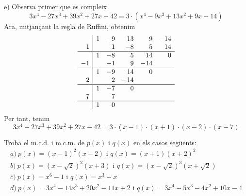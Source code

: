 \begin{solucio}
e) Observa primer que es compleix\[
3x^{4}-27x^{3}+39x^{2}+27x-42=3\cdot \left(
x^{4}-9x^{3}+13x^{2}+9x-14\right)
\]Ara, mitjançant la regla de Ruffini, obtenim\[
\begin{array}{r|rrrrr}
& 1 & -9 & 13 & 9 & -14 \\
1 & & 1 & -8 & 5 & 14 \\\hline
& 1 & -8 & 5 & 14 & 0 \\
-1 & & -1 & 9 & -14 & \\\hline
& 1 & -9 & 14 & 0 & \\
2 & & 2 & -14 & & \\\hline
& 1 & -7 & 0 & & \\
7 & & 7 & & & \\\hline
 & 1 & 0 & & &
\end{array}\]Per tant, tenim\[
3x^{4}-27x^{3}+39x^{2}+27x-42=3\cdot (x-1)\cdot (x+1)\cdot (x-2)\cdot (x-7)
\]
\end{solucio}

\begin{exercici}
Troba el m.c.d. i m.c.m. de $p(x)$ i $q(x)$ en els casos següents:\[
\begin{array}{l}
a)~p(x)=(x-1)^{2}(x-2)\text{ i }q(x)=(x+1)(x+2)^{2} \\
b)~p(x)=(x-\sqrt{2})^{2}(x+3)\text{ i }q(x)=(x-\sqrt{2})^{3}(x+\sqrt{2}) \\
c)~p(x)=x^{6}-1\text{ i }q(x)=x^{3}-x \\
d)~p(x)=3x^{4}-14x^{3}+20x^{2}-11x+2\text{ i }q(x)=3x^{4}-5x^{3}-4x^{2}+10x-4\end{array}\]
\end{exercici}

